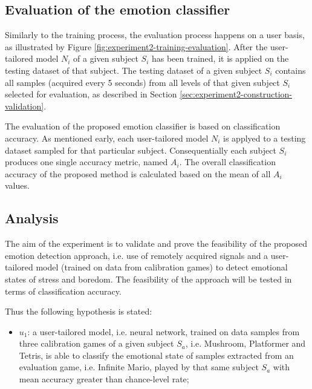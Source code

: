 \subsection{Evaluation of the emotion classifier}

Similarly to the training process, the evaluation process happens on a user basis, as illustrated by Figure \ref{fig:experiment2-training-evaluation}. After the user-tailored model $N_i$ of a given subject $S_i$ has been trained, it is applied on the testing dataset of that subject. The testing dataset of a given subject $S_i$ contains all samples (acquired every 5 seconds) from all levels of that given subject $S_i$ selected for evaluation, as described in Section \ref{sec:experiment2-construction-validation}.

The evaluation of the proposed emotion classifier is based on classification accuracy. As mentioned early, each user-tailored model $N_i$ is applyed to a testing dataset sampled for that particular subject. Consequentially each subject $S_i$ produces one single accuracy metric, named $A_i$. The overall classification accuracy of the proposed method is calculated based on the mean of all $A_i$ values.

\subsection{Analysis}

The aim of the experiment is to validate and prove the feasibility of the proposed emotion detection approach, i.e. use of remotely acquired signals and a user-tailored model (trained on data from calibration games) to detect emotional states of stress and boredom. The feasibility of the approach will be tested in terms of classification accuracy.

Thus the following hypothesis is stated:

\begin{itemize}
  \item $u_1$: a user-tailored model, i.e. neural network, trained on data samples from three calibration games of a given subject $S_a$, i.e. Mushroom, Platformer and Tetris, is able to classify the emotional state of samples extracted from an evaluation game, i.e. Infinite Mario, played by that same subject $S_a$ with mean accuracy greater than chance-level rate;
\end{itemize}

